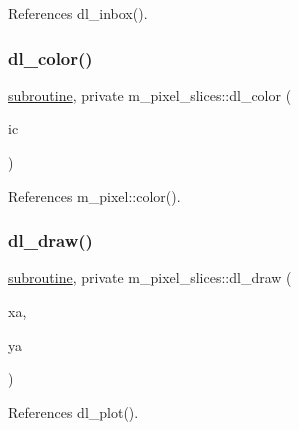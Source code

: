 References dl\+\_\+inbox().

\mbox{\label{namespacem__pixel__slices_a8e362bf8eea80faddc97f7d137c95f9c}} 
\subsubsection{\texorpdfstring{dl\+\_\+color()}{dl\_color()}}
{\footnotesize\ttfamily \hyperlink{M__stopwatch_83_8txt_acfbcff50169d691ff02d4a123ed70482}{subroutine}, private m\+\_\+pixel\+\_\+slices\+::dl\+\_\+color (\begin{DoxyParamCaption}\item[{}]{ic }\end{DoxyParamCaption})\hspace{0.3cm}{\ttfamily [private]}}



References m\+\_\+pixel\+::color().

\mbox{\label{namespacem__pixel__slices_acafdf0174290a0e231ca120f6305b5d0}} 
\subsubsection{\texorpdfstring{dl\+\_\+draw()}{dl\_draw()}}
{\footnotesize\ttfamily \hyperlink{M__stopwatch_83_8txt_acfbcff50169d691ff02d4a123ed70482}{subroutine}, private m\+\_\+pixel\+\_\+slices\+::dl\+\_\+draw (\begin{DoxyParamCaption}\item[{}]{xa,  }\item[{}]{ya }\end{DoxyParamCaption})\hspace{0.3cm}{\ttfamily [private]}}



References dl\+\_\+plot().

\mbox{\label{namespacem__pixel__slices_aa0de53a25754eab8fff1732aa2f93eba}} 
